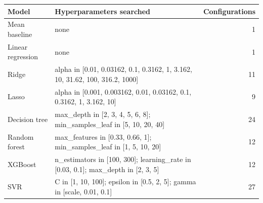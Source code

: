 \begin{tabular}{lp{10.5cm}r}
\toprule
\textbf{Model} & \textbf{Hyperparameters searched} & \textbf{Configurations} \\
\midrule
Mean baseline & none & 1 \\
Linear regression & none & 1 \\
Ridge & alpha in [0.01, 0.03162, 0.1, 0.3162, 1, 3.162, 10, 31.62, 100, 316.2, 1000] & 11 \\
Lasso & alpha in [0.001, 0.003162, 0.01, 0.03162, 0.1, 0.3162, 1, 3.162, 10] & 9 \\
Decision tree & max\_depth in [2, 3, 4, 5, 6, 8]; min\_samples\_leaf in [5, 10, 20, 40] & 24 \\
Random forest & max\_features in [0.33, 0.66, 1]; min\_samples\_leaf in [1, 5, 10, 20] & 12 \\
XGBoost & n\_estimators in [100, 300]; learning\_rate in [0.03, 0.1]; max\_depth in [2, 3, 5] & 12 \\
SVR & C in [1, 10, 100]; epsilon in [0.5, 2, 5]; gamma in [scale, 0.01, 0.1] & 27 \\
\bottomrule
\end{tabular}

